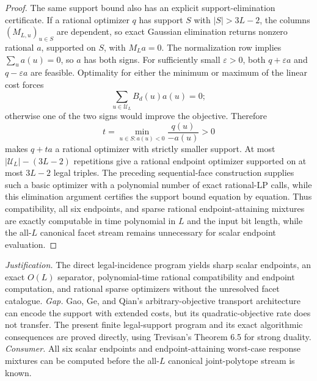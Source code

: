 \documentclass{article}
\begin{document}
\begin{proof}
The same support bound also has an explicit support-elimination certificate.  If a rational optimizer \(q\) has support \(S\) with \(|S|>3L-2\), the columns \((M_{L,u})_{u\in S}\) are dependent, so exact Gaussian elimination returns nonzero rational \(a\), supported on \(S\), with \(M_La=0\).  The normalization row implies \(\sum_ua(u)=0\), so \(a\) has both signs.  For sufficiently small \(\varepsilon>0\), both \(q+\varepsilon a\) and \(q-\varepsilon a\) are feasible.  Optimality for either the minimum or maximum of the linear cost forces
\[
 \sum_{u\in\mathcal U_L}B_d(u)a(u)=0;
\]
otherwise one of the two signs would improve the objective.  Therefore
\[
 t=\min_{u\in S:a(u)<0}\frac{q(u)}{-a(u)}>0
\]
makes \(q+ta\) a rational optimizer with strictly smaller support.  At most \(|\mathcal U_L|-(3L-2)\) repetitions give a rational endpoint optimizer supported on at most \(3L-2\) legal triples.  The preceding sequential-face construction supplies such a basic optimizer with a polynomial number of exact rational-LP calls, while this elimination argument certifies the support bound equation by equation.  Thus compatibility, all six endpoints, and sparse rational endpoint-attaining mixtures are exactly computable in time polynomial in \(L\) and the input bit length, while the all-\(L\) canonical facet stream remains unnecessary for scalar endpoint evaluation.
\end{proof}
\par\smallskip\noindent \textit{Justification.} The direct legal-incidence program yields sharp scalar endpoints, an exact \(O(L)\) separator, polynomial-time rational compatibility and endpoint computation, and rational sparse optimizers without the unresolved facet catalogue. \textit{Gap.} Gao, Ge, and Qian's arbitrary-objective transport architecture can encode the support with extended costs, but its quadratic-objective rate does not transfer.  The present finite legal-support program and its exact algorithmic consequences are proved directly, using Trevisan's Theorem 6.5 for strong duality. \textit{Consumer.} All six scalar endpoints and endpoint-attaining worst-case response mixtures can be computed before the all-\(L\) canonical joint-polytope stream is known.
\end{document}
